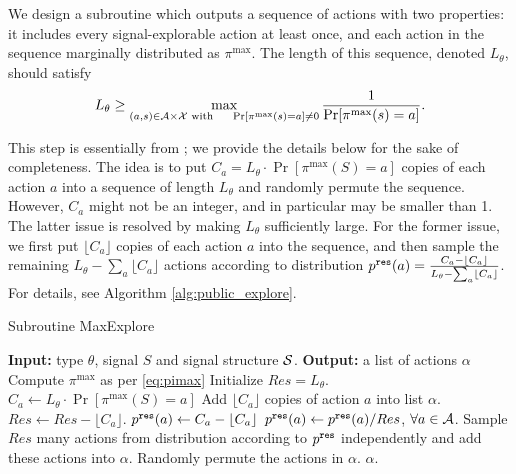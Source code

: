We design a subroutine  which outputs a sequence of actions with two properties: it includes every signal-explorable action at least once, and each action in the sequence marginally distributed as $\pi^{\max}$. The length of this sequence, denoted $L_{\theta}$, should satisfy
\begin{align}\label{eq:public-L}
L_{\theta} \geq \max_{(a,s)\in \A\times \X \text{ with }\quad \Pr[\pi^{\max}(s)=a] \neq 0} \frac{1}{\Pr[\pi^{\max}(s)=a]}.
\end{align}

This step is essentially from \cite{ICexplorationGames-ec16};
 we provide the details below for the sake of completeness.
The idea is to put $C_a = L_{\theta} \cdot \Pr[\pi^{\max}(S) = a]$ copies of each action $a$ into a sequence of length $L_{\theta}$ and randomly permute the sequence.
 However, $C_a$ might not be an integer, and in particular may be smaller than 1. The latter issue is resolved by making $L_{\theta}$ sufficiently large. For the former issue, we first put $\lfloor C_a \rfloor$ copies of each action $a$ into the sequence, and then sample the remaining
    $L_\theta - \sum_a \lfloor C_a \rfloor$
actions according to distribution
    $\pRes(a) = \frac{C_a - \lfloor C_a \rfloor}{L_\theta - \sum_a \lfloor C_a \rfloor}$.
For details, see Algorithm \ref{alg:public_explore}.
 \begin{algorithm}[H]
    \caption{Subroutine MaxExplore}
    	\label{alg:public_explore}
    \begin{algorithmic}[1]
	\STATE \textbf{Input:} type $\theta$, signal $S$ and signal structure $\S$.
	\STATE \textbf{Output:} a list of actions $\alpha$
	\STATE Compute $\pi^{\max}$ as per \eqref{eq:pimax}
		\STATE Initialize $Res = L_{\theta}$.
							\STATE $C_a \leftarrow  L_{\theta} \cdot \Pr[\pi^{\max}(S) = a]$
                     		\STATE Add $\lfloor C_a \rfloor$ copies of action $a$ into list $\alpha$.
			\STATE $Res \leftarrow Res -\lfloor C_a \rfloor $.
			\STATE $\pRes(a)\leftarrow  C_a -  \lfloor C_a\rfloor$
		\ENDFOR
		\STATE $\pRes(a) \leftarrow \pRes(a) / Res$, $\forall a \in \A$.
		\STATE Sample $Res$ many actions from distribution according to $\pRes$ independently and add these actions into $\alpha$.
		\STATE Randomly permute the actions in $\alpha$.
	\RETURN $\alpha$.	
     \end{algorithmic}
\end{algorithm}

